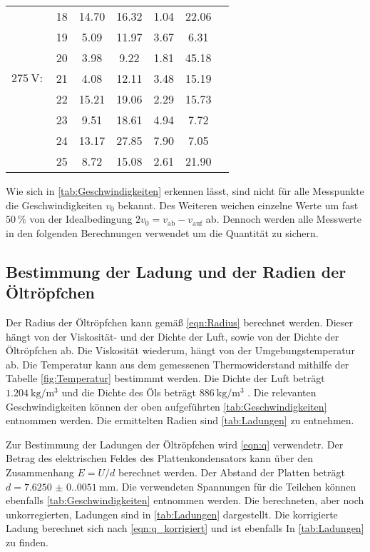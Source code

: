 \begin{table}[H]
\begin{tabular}{c l S[table-format = 2.2] S S S[table-format = 1.2] S[table-format = 2.2]}
        {                   } & {18} & 14.70 & 16.32 & 1.04 & 22.06 \\
        {                   } & {19} &  5.09 & 11.97 & 3.67 &  6.31 \\
        {                   } & {20} &  3.98 &  9.22 & 1.81 & 45.18 \\
        {$\qty{275}{\volt}:$} & {21} &  4.08 & 12.11 & 3.48 & 15.19 \\
        {                   } & {22} & 15.21 & 19.06 & 2.29 & 15.73 \\
        {                   } & {23} &  9.51 & 18.61 & 4.94 &  7.72 \\
        {                   } & {24} & 13.17 & 27.85 & 7.90 &  7.05 \\
        {                   } & {25} &  8.72 & 15.08 & 2.61 & 21.90 \\
      \bottomrule
    \end{tabular}
  \end{table}

Wie sich in \autoref{tab:Geschwindigkeiten} erkennen lässt, sind nicht für alle Messpunkte die Geschwindigkeiten $v_0$ bekannt. Des Weiteren weichen einzelne Werte um fast 
$\qty{50}{\percent}$ von der Idealbedingung $2v_0 = v_\text{ab} - v_\text{auf}$ ab. Dennoch werden alle Messwerte in den folgenden Berechnungen verwendet um die Quantität
zu sichern. 

\subsection{Bestimmung der Ladung und der Radien der Öltröpfchen}
\label{subsec:ladungradius}
Der Radius der Öltröpfchen kann gemäß \autoref{eqn:Radius} berechnet werden. Dieser hängt von der Viskosität-
und der Dichte der Luft, sowie von der Dichte der Öltröpfchen ab. Die Viskosität wiederum, hängt von der Umgebungstemperatur ab. Die Temperatur kann aus dem gemessenen 
Thermowiderstand mithilfe der Tabelle \ref{fig:Temperatur} bestimmmt werden. Die Dichte der Luft beträgt $\qty{1.204}{\kilo\gram\per\cubic\metre}$
und die Dichte des Öls beträgt $\qty{886}{\kilo\gram\per\cubic\metre}$ \cite{v503}. Die relevanten Geschwindigkeiten können der oben aufgeführten \autoref{tab:Geschwindigkeiten}
entnommen werden. Die ermittelten Radien sind \autoref{tab:Ladungen} zu entnehmen. 

Zur Bestimmung der Ladungen der Öltröpfchen wird \autoref{eqn:q} verwendetr.
Der Betrag des elektrischen Feldes des Plattenkondensators kann über den Zusammenhang $E = U/d$ berechnet werden. Der Abstand der Platten beträgt $d = \qty{7.6250(0.0051)}{\milli\metre}$.
Die verwendeten Spannungen für die Teilchen können ebenfalls \autoref{tab:Geschwindigkeiten} entnommen werden. Die berechneten,
aber noch unkorregierten, Ladungen sind in \autoref{tab:Ladungen} dargestellt. Die korrigierte Ladung berechnet sich nach \autoref{eqn:q_korrigiert} und ist ebenfalls In
\autoref{tab:Ladungen} zu finden.

